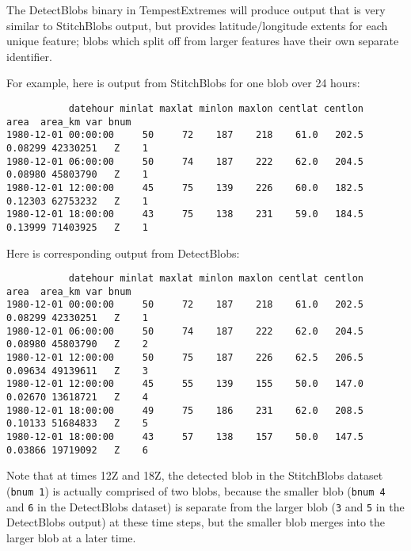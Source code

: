 \documentclass{article}
\begin{document}
The DetectBlobs binary in TempestExtremes  will produce output that is very similar to StitchBlobs output, but provides latitude/longitude extents for each unique feature; blobs which split off from larger features have their own separate identifier.


For example, here is output from StitchBlobs for one blob over 24 hours:
\begin{verbatim}
           datehour minlat maxlat minlon maxlon centlat centlon    area  area_km var bnum
1980-12-01 00:00:00     50     72    187    218    61.0   202.5 0.08299 42330251   Z    1
1980-12-01 06:00:00     50     74    187    222    62.0   204.5 0.08980 45803790   Z    1
1980-12-01 12:00:00     45     75    139    226    60.0   182.5 0.12303 62753232   Z    1
1980-12-01 18:00:00     43     75    138    231    59.0   184.5 0.13999 71403925   Z    1
\end{verbatim}

Here  is corresponding output from DetectBlobs:

\begin{verbatim}
           datehour minlat maxlat minlon maxlon centlat centlon    area  area_km var bnum
1980-12-01 00:00:00     50     72    187    218    61.0   202.5 0.08299 42330251   Z    1
1980-12-01 06:00:00     50     74    187    222    62.0   204.5 0.08980 45803790   Z    2
1980-12-01 12:00:00     50     75    187    226    62.5   206.5 0.09634 49139611   Z    3
1980-12-01 12:00:00     45     55    139    155    50.0   147.0 0.02670 13618721   Z    4
1980-12-01 18:00:00     49     75    186    231    62.0   208.5 0.10133 51684833   Z    5
1980-12-01 18:00:00     43     57    138    157    50.0   147.5 0.03866 19719092   Z    6
\end{verbatim}

Note that at times 12Z and 18Z, the detected blob in the StitchBlobs dataset (\texttt{bnum 1}) is actually comprised of two  blobs, because the smaller blob (\texttt{bnum 4} and \texttt{6} in the DetectBlobs dataset) is separate from the larger blob (\texttt{3} and \texttt{5} in the DetectBlobs output) at these time steps, but the smaller blob merges into the larger blob at a later time.
\end{document}
